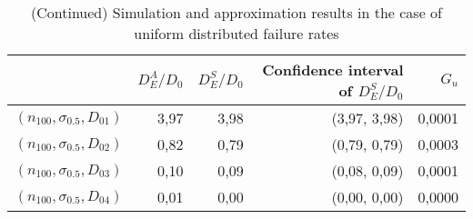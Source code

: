 \documentclass[preprint,12pt]{elsarticle}
\begin{document}
\begin{table}[htbp]
  \centering
  \caption{(Continued) Simulation and approximation results in the case of uniform distributed failure rates}
    \begin{tabular}{rrrrr}
     \toprule
          & $D_{E}^{A}/D_0$ & $D_{E}^{S}/D_0$ & Confidence interval of $D_{E}^{S}/D_0$ &  $G_{u}$ \\
    \midrule
    $(n_{100},\sigma_{0.5},D_{01})$  & 3,97  & 3,98  & (3,97, 3,98) & 0,0001 \\
    $(n_{100},\sigma_{0.5},D_{02})$ & 0,82  & 0,79  & (0,79, 0,79) & 0,0003 \\
    $(n_{100},\sigma_{0.5},D_{03})$ & 0,10  & 0,09  & (0,08, 0,09) & 0,0001\\
    $(n_{100},\sigma_{0.5},D_{04})$ & 0,01  & 0,00  & (0,00, 0,00) & 0,0000 \\
    \bottomrule
    \end{tabular}%
  \label{uniform2}%
\end{table}%
\end{document}
